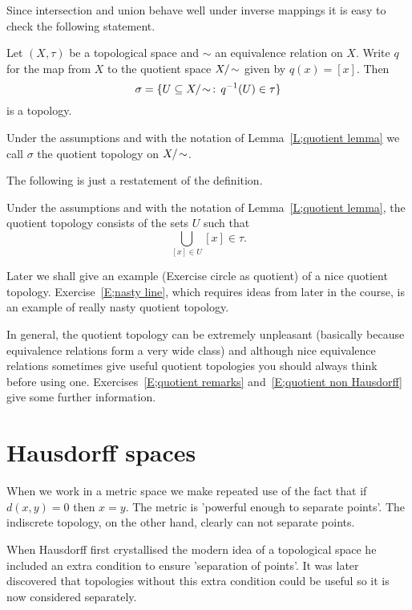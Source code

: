 Since intersection and union behave well under
inverse mappings it is
easy to check the following statement.
\begin{lemma}\label{L;quotient lemma}
Let $(X,\tau)$ be a topological space
and $\sim$ an equivalence relation on $X$.
Write $q$ for the map from $X$ to the
quotient space $X/\negthinspace\sim$
given by $q(x)=[x]$. Then
\[\sigma=\{U\subseteq X/\negthinspace\sim\,:\,q^{-1}(U)\in\tau\}\]
is a topology.
\end{lemma}
\begin{definition} Under the assumptions and with the notation
of Lemma~\ref{L;quotient lemma} we call $\sigma$ the quotient
topology on $X/\negthinspace\sim$.
\end{definition}
The following is just a restatement of the definition.
\begin{lemma} Under the assumptions and with the notation
of Lemma~\ref{L;quotient lemma}, the quotient topology
consists of the sets $U$ such that
\[\bigcup_{[x]\in U}[x]\in\tau.\]
\end{lemma}
Later we shall give an example (Exercise circle as quotient)
of a nice quotient topology.
Exercise~\ref{E;nasty line}, which requires
ideas from later in the course, is an example of really
nasty  quotient topology.

In general, the quotient topology can be extremely
unpleasant (basically because equivalence relations
form a very wide class) and although nice equivalence
relations sometimes give useful quotient topologies
you should always think before using one.
Exercises~\ref{E;quotient remarks} and~\ref{E;quotient non Hausdorff}
give some further information.

















\section{Hausdorff spaces}\label{S;Hausdorff spaces}
When we work in a metric space we make
repeated use of the fact that if $d(x,y)=0$ then $x=y$.
The metric is 'powerful enough to separate points'.
The indiscrete topology, on the other hand, clearly
can not separate points.

When Hausdorff first crystallised the modern idea
of a topological space he included an extra condition
to ensure 'separation of points'. It was later
discovered that topologies without this extra condition
could be useful so it is now considered separately.

